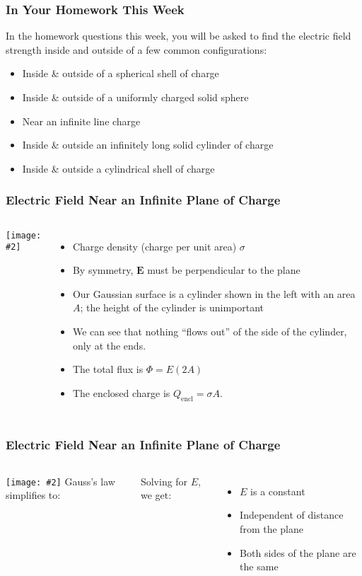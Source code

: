 \documentclass[12pt,aspectratio=169]{beamer}
\newcommand{\pic}[2]{\texttt{[image: \#2]}}
\newcommand{\mb}[1]{\mathbf{#1}}
\newcommand{\eq}[2]{\vspace{#1}{\Large\begin{displaymath}#2\end{displaymath}}}
\begin{document}
\begin{frame}
  \frametitle{In Your Homework This Week}
  In the homework questions this week, you will be asked to find the
  electric field strength inside and outside of a few common configurations:
  \begin{itemize}
  \item Inside \& outside of a spherical shell of charge
  \item Inside \& outside of a uniformly charged solid sphere
  \item Near an infinite line charge
  \item Inside \& outside an infinitely long solid cylinder of charge
  \item Inside \& outside a cylindrical shell of charge
  \end{itemize}
\end{frame}


\begin{frame}
  \frametitle{Electric Field Near an Infinite Plane of Charge}
  \begin{columns}
    \pic{1.3}{elec_gauss_figure9.jpg}
    \begin{itemize}
    \item Charge density (charge per unit area) $\sigma$
    \item By symmetry, $\mb{E}$ must be perpendicular to the plane
    \item Our Gaussian surface is a cylinder shown in the left with an area
      $A$; the height of the cylinder is unimportant
    \item We can see that nothing ``flows out'' of the side of the cylinder,
      only at the ends.
    \item The total flux is $\Phi=E(2A)$
    \item The enclosed charge is $Q_\mathrm{encl}=\sigma A$.
    \end{itemize}
  \end{columns}
\end{frame}


\begin{frame}
  \frametitle{Electric Field Near an Infinite Plane of Charge}
  \begin{columns}
    \pic{1.3}{elec_gauss_figure9.jpg}
    Gauss's law simplifies to:
    
    \eq{-.35in}{
      \oint\mb{E}\cdot d\mb{A}=\frac{Q_\mathrm{encl}}{\epsilon_0}
      \;\;\rightarrow\;\;
      E(2A)=\frac{\sigma A}{\epsilon_0}
    }

    Solving for $E$, we get:

    \eq{-.3in}{\boxed{E=\frac{\sigma}{2\epsilon_0}}}
    \begin{itemize}
    \item $E$ is a constant
    \item Independent of distance from the plane
    \item Both sides of the plane are the same
    \end{itemize}
  \end{columns}
\end{frame}
\end{document}
